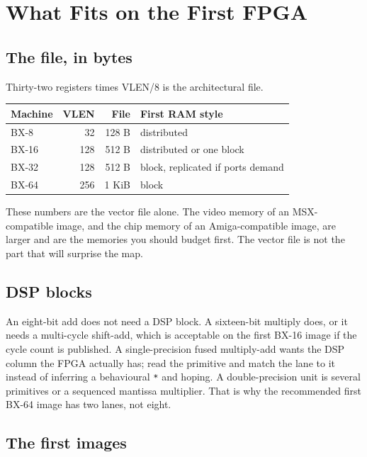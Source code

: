 \chapter{What Fits on the First FPGA}

\section{The file, in bytes}

Thirty-two registers times VLEN/8 is the architectural file.

\begin{center}
\begin{tabular}{@{}lrrl@{}}
\toprule
Machine & VLEN & File & First RAM style \\
\midrule
BX-8  & 32  & 128 B  & distributed \\
BX-16 & 128 & 512 B  & distributed or one block \\
BX-32 & 128 & 512 B  & block, replicated if ports demand \\
BX-64 & 256 & 1 KiB  & block \\
\bottomrule
\end{tabular}
\end{center}

These numbers are the vector file alone. The video memory of an MSX-compatible image, and the chip memory of an Amiga-compatible image, are larger and are the memories you should budget first. The vector file is not the part that will surprise the map.

\section{DSP blocks}

An eight-bit add does not need a DSP block. A sixteen-bit multiply does, or it needs a multi-cycle shift-add, which is acceptable on the first BX-16 image if the cycle count is published. A single-precision fused multiply-add wants the DSP column the FPGA actually has; read the primitive and match the lane to it instead of inferring a behavioural \texttt{*} and hoping. A double-precision unit is several primitives or a sequenced mantissa multiplier. That is why the recommended first BX-64 image has two lanes, not eight.

\section{The first images}

